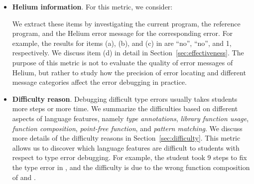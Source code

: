 \documentclass[12pt]{report}	%
\begin{document}
\begin{itemize}[noitemsep]
\item \textbf{Helium information}.
For this metric, we consider:
%
We extract these items by investigating the current program,
the reference program, and the Helium error message for the corresponding error.
For example, the results for items (a), (b), and (c)
in  are ``no'', ``no'', and 1, respectively. 
We discuss item (d) in detail in Section~\ref{sec:effectiveness}.
%
The purpose of this metric is not to evaluate the quality
of error messages of Helium, but rather to study how
the precision of error locating and different message categories 
affect the error debugging in practice.


\item \textbf{Difficulty reason}.
Debugging difficult type errors usually takes
students more steps or more time.
We summarize the difficulties based on different aspects of language features,
namely \emph{type annotations},
\emph{library function usage}, \emph{function composition},
\emph{point-free function}, and \emph{pattern matching}. 
We discuss more details of the difficulty reasons in
Section~\ref{sec:difficulty}.
This metric
allows us to discover which language features are difficult to students
with respect to type error debugging.
For example, the student took 9 steps to fix the type error in ,
and the difficulty is due to the wrong function composition of  and .

\end{itemize}
\end{document}
